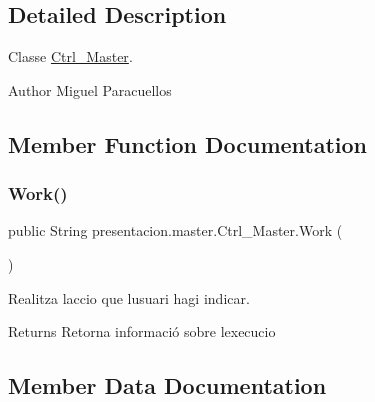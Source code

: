 \subsection{Detailed Description}
Classe \hyperlink{classpresentacion_1_1master_1_1Ctrl__Master}{Ctrl\+\_\+\+Master}. 

\begin{DoxyAuthor}{Author}
Miguel Paracuellos 
\end{DoxyAuthor}


\subsection{Member Function Documentation}
\mbox{\label{classpresentacion_1_1master_1_1Ctrl__Master_aa25099e202de5e076b950e4e3bf5c26b}} 
\subsubsection{\texorpdfstring{Work()}{Work()}}
{\footnotesize\ttfamily public String presentacion.\+master.\+Ctrl\+\_\+\+Master.\+Work (\begin{DoxyParamCaption}{ }\end{DoxyParamCaption})\hspace{0.3cm}{\ttfamily [inline]}}



Realitza l\textquotesingle{}accio que l\textquotesingle{}usuari hagi indicar. 

\begin{DoxyReturn}{Returns}
Retorna informació sobre l\textquotesingle{}execucio 
\end{DoxyReturn}


\subsection{Member Data Documentation}
\mbox{\label{classpresentacion_1_1master_1_1Ctrl__Master_a5358a65f5f7bc39f860af1d858739d41}} 
